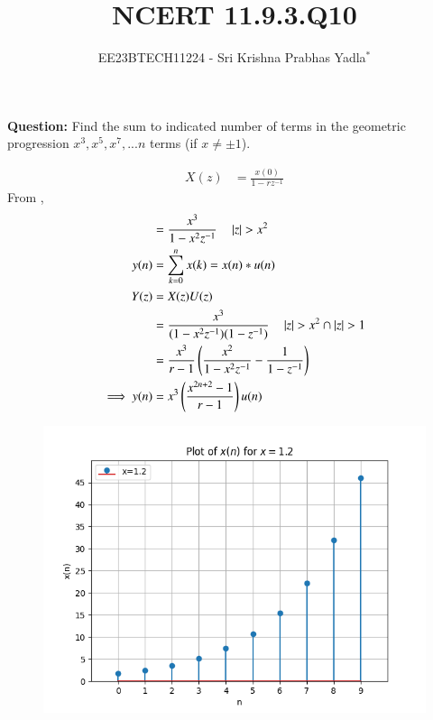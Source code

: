 \documentclass[journal,12pt,twocolumn]{IEEEtran}
\theoremstyle{remark}
\begin{document}

\vspace{3cm}

\title{NCERT 11.9.3.Q10}
\author{EE23BTECH11224 - Sri Krishna Prabhas Yadla$^{*}$%
}
\maketitle
\newpage
\bigskip

\renewcommand{\thefigure}{\arabic{figure}}
\renewcommand{\thetable}{\arabic{table}}


\vspace{3cm}
\textbf{Question:} Find the sum to indicated number of terms in the geometric progression \(x^3,x^5,x^7,...n\) terms (if \(x\neq\pm1\)).
\\
\solution

\newline
\begin{align}
	X(z) &= \frac{x(0)}{1-rz^{-1}}
\end{align}
From ,
\begin{align}
	&= \frac{x^3}{1-x^2z^{-1}} \quad \left\vert z\right\vert>x^2 \\
	y(n) &= \sum_{k=0}^{n}x(k) = x(n)*u(n) \\
	Y(z) &= X(z)U(z) \\
	&= \frac{x^3}{(1-x^2z^{-1})(1-z^{-1})} \quad  \left\vert z\right\vert > x^2 \cap \left\vert z\right\vert>1\\
	&= \frac{x^3}{r-1}\left(\frac{x^2}{1-x^2z^{-1}}-\frac{1}{1-z^{-1}}\right) \\
	\implies y(n) &= x^3\left(\frac{x^{2n+2}-1}{r-1}\right)u(n)
\end{align}
\begin{figure}[ht!]
	\includegraphics[width=\columnwidth]{figs/plot_2.png}
	\caption{}
	\label{fig:1.2}
\end{figure}
\end{document}
